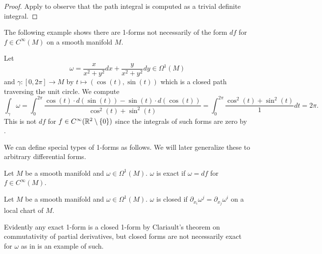 \begin{proof}
    Apply  to observe that the path integral is computed as a trivial definite integral. 
\end{proof}
The following example shows there are 1-forms not necessarily of the form $df$ for $f\in C^{\infty}(M)$ on a smooth manifold $M$. 
\begin{example}\label{ex: loop integral of 1-form}
    Let 
    $$\omega=\frac{x}{x^{2}+y^{2}}dx+\frac{y}{x^{2}+y^{2}}dy\in\Omega^{1}(M)$$
    and $\gamma:[0,2\pi]\to M$ by $t\mapsto(\cos(t),\sin(t))$ which is a closed path traversing the unit circle. We compute 
    $$\int_{\gamma}\omega=\int_{0}^{2\pi}\frac{\cos(t)\cdot d(\sin(t))-\sin(t)\cdot d(\cos(t))}{\cos^{2}(t)+\sin^{2}(t)}=\int_{0}^{2\pi}\frac{\cos^{2}(t)+\sin^{2}(t)}{1}dt=2\pi.$$
    This is not $df$ for $f\in C^{\infty}(\mathbb{R}^{2}\setminus\{0\})$ since the integrals of such forms are zero by . 
\end{example}
We can define special types of 1-forms as follows. We will later generalize these to arbitrary differential forms. 
\begin{definition}\label{def: exact 1-form}
    Let $M$ be a smooth manifold and $\omega\in\Omega^{1}(M)$. $\omega$ is exact if $\omega=df$ for $f\in C^{\infty}(M)$. 
\end{definition}
\begin{definition}\label{def: closed 1-form}
    Let $M$ be a smooth manifold and $\omega\in\Omega^{1}(M)$. $\omega$ is closed if $\partial_{x_{i}}\omega^{j}=\partial_{x_{j}}\omega^{i}$ on a local chart of $M$. 
\end{definition}
Evidently any exact 1-form is a closed 1-form by Clariault's theorem on commutativity of partial derivatives, but closed forms are not necessarily exact for $\omega$ as in  is an example of such. 


